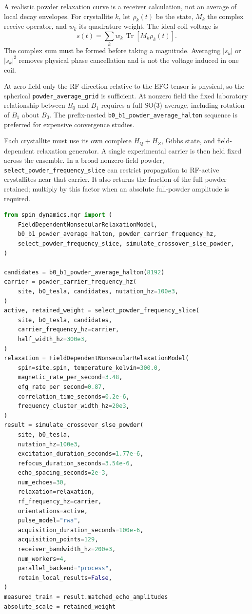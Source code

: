 \documentclass[11pt,oneside]{report}
\newcommand{\code}[1]{\texttt{#1}}
\begin{document}
A realistic powder relaxation curve is a receiver calculation, not an average
of local decay envelopes. For crystallite \(k\), let \(\rho_k(t)\) be the state,
\(M_k\) the complex receive operator, and \(w_k\) its quadrature weight. The
ideal coil voltage is
\[
  s(t)=\sum_k w_k\,\operatorname{Tr}\!\left[M_k\rho_k(t)\right].
\]
The complex sum must be formed before taking a magnitude. Averaging
\(\lvert s_k\rvert\) or \(\lvert s_k\rvert^2\) removes physical phase
cancellation and is not the voltage induced in one coil.

At zero field only the RF direction relative to the EFG tensor is physical, so
the spherical \code{powder\_average\_grid} is sufficient. At nonzero field the
fixed laboratory relationship between \(B_0\) and \(B_1\) requires a full
SO(3) average, including rotation of \(B_1\) about \(B_0\). The prefix-nested
\code{b0\_b1\_powder\_average\_halton} sequence is preferred for expensive
convergence studies.

Each crystallite must use its own complete \(H_Q+H_Z\), Gibbs state, and
field-dependent relaxation generator. A single experimental carrier is then
held fixed across the ensemble. In a broad nonzero-field powder,
\code{select\_powder\_frequency\_slice} can restrict propagation to
RF-active crystallites near that carrier. It also returns the fraction of the
full powder retained; multiply by this factor when an absolute full-powder
amplitude is required.

\begin{lstlisting}[language=Python]
from spin_dynamics.nqr import (
    FieldDependentNonsecularRelaxationModel,
    b0_b1_powder_average_halton, powder_carrier_frequency_hz,
    select_powder_frequency_slice, simulate_crossover_slse_powder,
)

candidates = b0_b1_powder_average_halton(8192)
carrier = powder_carrier_frequency_hz(
    site, b0_tesla, candidates, nutation_hz=100e3,
)
active, retained_weight = select_powder_frequency_slice(
    site, b0_tesla, candidates,
    carrier_frequency_hz=carrier,
    half_width_hz=300e3,
)
relaxation = FieldDependentNonsecularRelaxationModel(
    spin=site.spin, temperature_kelvin=300.0,
    magnetic_rate_per_second=3.48,
    efg_rate_per_second=0.87,
    correlation_time_seconds=0.2e-6,
    frequency_cluster_width_hz=20e3,
)
result = simulate_crossover_slse_powder(
    site, b0_tesla,
    nutation_hz=100e3,
    excitation_duration_seconds=1.77e-6,
    refocus_duration_seconds=3.54e-6,
    echo_spacing_seconds=2e-3,
    num_echoes=30,
    relaxation=relaxation,
    rf_frequency_hz=carrier,
    orientations=active,
    pulse_model="rwa",
    acquisition_duration_seconds=100e-6,
    acquisition_points=129,
    receiver_bandwidth_hz=200e3,
    num_workers=4,
    parallel_backend="process",
    retain_local_results=False,
)
measured_train = result.matched_echo_amplitudes
absolute_scale = retained_weight
\end{lstlisting}
\end{document}

